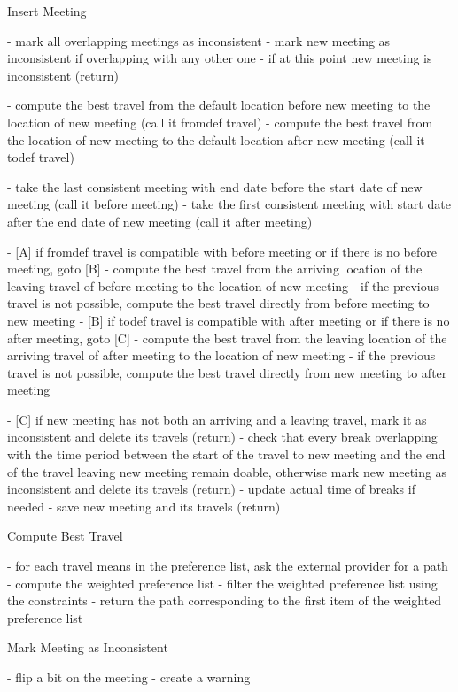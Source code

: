 Insert Meeting

- mark all overlapping meetings as inconsistent
- mark new meeting as inconsistent if overlapping with any other one
- if at this point new meeting is inconsistent (return)

- compute the best travel from the default location before new meeting to the location of new meeting (call it fromdef travel)
- compute the best travel from the location of new meeting to the default location after new meeting (call it todef travel)

- take the last consistent meeting with end date before the start date of new meeting (call it before meeting)
- take the first consistent meeting with start date after the end date of new meeting (call it after meeting)

- [A] if fromdef travel is compatible with before meeting or if there is no before meeting, goto [B]
- compute the best travel from the arriving location of the leaving travel of before meeting to the location of new meeting
- if the previous travel is not possible, compute the best travel directly from before meeting to new meeting
- [B] if todef travel is compatible with after meeting or if there is no after meeting, goto [C]
- compute the best travel from the leaving location of the arriving travel of after meeting to the location of new meeting
- if the previous travel is not possible, compute the best travel directly from new meeting to after meeting

- [C] if new meeting has not both an arriving and a leaving travel, mark it as inconsistent and delete its travels (return)
- check that every break overlapping with the time period between the start of the travel to new meeting and the end of the travel leaving new meeting remain doable, otherwise mark new meeting as inconsistent and delete its travels (return)
- update actual time of breaks if needed
- save new meeting and its travels (return)


Compute Best Travel

- for each travel means in the preference list, ask the external provider for a path
- compute the weighted preference list
- filter the weighted preference list using the constraints
- return the path corresponding to the first item of the weighted preference list

Mark Meeting as Inconsistent

- flip a bit on the meeting
- create a warning